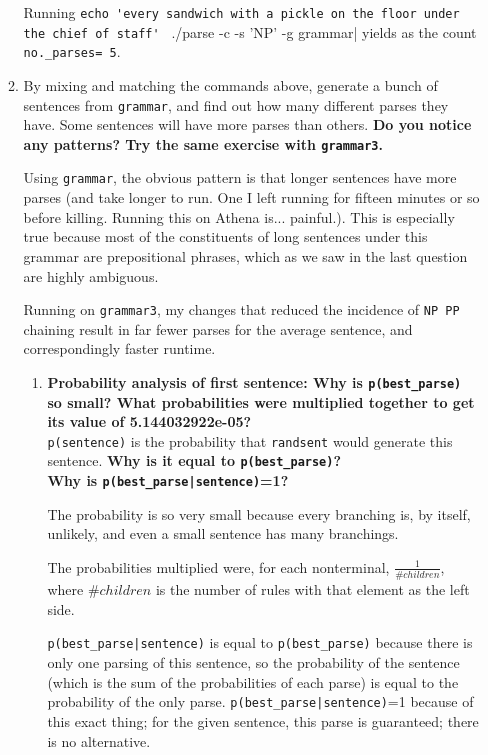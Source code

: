 \documentclass[10pt]{article}
\begin{document}
\begin{enumerate}
\begin{enumerate}
Running \verb|echo 'every sandwich with a pickle on the floor under the chief of staff' | ./parse -c -s 'NP' -g grammar| yields as the count \verb|no._parses= 5|.

\item By mixing and matching the commands above, generate a bunch of
  sentences from \verb|grammar|, and find out how many different parses they
  have. Some sentences will have more parses than others. {\bf Do you
  notice any patterns? Try the same exercise with \verb|grammar3|.}
  
Using \verb|grammar|, the obvious pattern is that longer sentences have more parses (and take longer to run. One I left running for fifteen minutes or so before killing. Running this on Athena is... painful.). This is especially true because most of the constituents of long sentences under this grammar are prepositional phrases, which as we saw in the last question are highly ambiguous.

Running on \verb|grammar3|, my changes that reduced the incidence of \verb|NP PP| chaining result in far fewer parses for the average sentence, and correspondingly faster runtime.

\begin{enumerate} 
\item {\bf Probability analysis of first sentence: Why is \verb|p(best_parse)| so small?  What probabilities were
  multiplied together to get its value of 5.144032922e-05?}\\
\noindent
\verb|p(sentence)| is the probability that \verb|randsent| would
  generate this sentence. {\bf Why is it equal to \verb|p(best_parse)|?}\\
\noindent
{\bf Why is \verb+p(best_parse|sentence)+=1?}

The probability is so very small because every branching is, by itself, unlikely, and even a small sentence has many branchings.

The probabilities multiplied were, for each nonterminal, $\frac{1}{\#children}$, where $\#children$ is the number of rules with that element as the left side.

\verb+p(best_parse|sentence)+ is equal to \verb+p(best_parse)+ because there is only one parsing of this sentence, so the probability of the sentence (which is the sum of the probabilities of each parse) is equal to the probability of the only parse. \verb+p(best_parse|sentence)+=1 because of this exact thing; for the given sentence, this parse is guaranteed; there is no alternative.


\end{enumerate}
\end{enumerate}
\end{enumerate}
\end{document}
